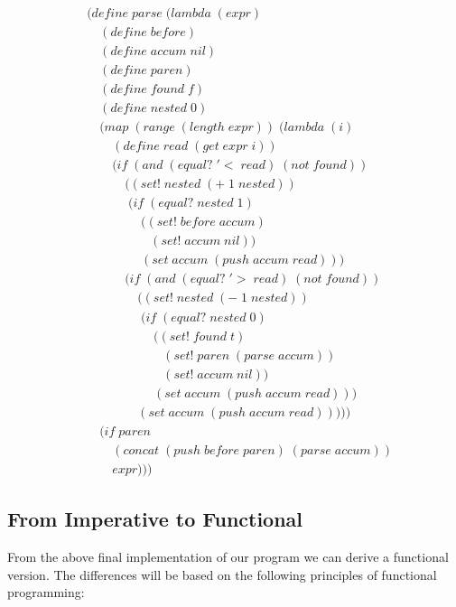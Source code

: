 \documentclass[11pt]{article}
\begin{document}
\begin{align*}
& (define \; parse \; (lambda \; (expr) \; 
\\& \quad (define \; before)
\\& \quad (define \; accum \; nil)
\\& \quad (define \; paren)
\\& \quad (define \; found \; f)
\\& \quad (define \; nested \; 0)
\\& \quad (map \; (range \; (length \; expr)) \; (lambda \; (i)
\\& \qquad (define \; read \; (get \; expr \; i))
\\& \qquad (if \; (and \; (equal? \; '< \; read) \; (not \; found))
\\& \qquad \quad ((set! \; nested \; (+ \; 1 \; nested))
\\& \qquad \quad \; (if \; (equal? \; nested \; 1)
\\& \qquad \qquad \; ((set! \; before \; accum)
\\& \qquad \qquad \quad (set! \; accum \; nil))
\\& \qquad \qquad \; (set \; accum \; (push \; accum \; read)))
\\& \qquad \quad (if \; (and \; (equal? \; '> \; read) \; (not \; found))
\\& \qquad \qquad ((set! \; nested \; (- \; 1 \; nested))
\\& \qquad \qquad \; (if \; (equal? \; nested \; 0)
\\& \qquad \qquad \quad \; ((set! \; found \; t)
\\& \qquad \qquad \qquad (set! \; paren \; (parse \; accum))
\\& \qquad \qquad \qquad (set! \; accum \; nil))
\\& \qquad \qquad \quad \; (set \; accum \; (push \; accum \; read)))
\\& \qquad \qquad (set \; accum \; (push \; accum \; read)))))
\\& \quad (if \; paren
\\& \qquad (concat \; (push \; before \; paren) \; (parse \; accum))
\\& \qquad expr)))
\end{align*}

\subsection{From Imperative to Functional}
From the above final implementation of our program we can derive a functional version. The differences will be based on the following principles of functional programming:
\end{document}
